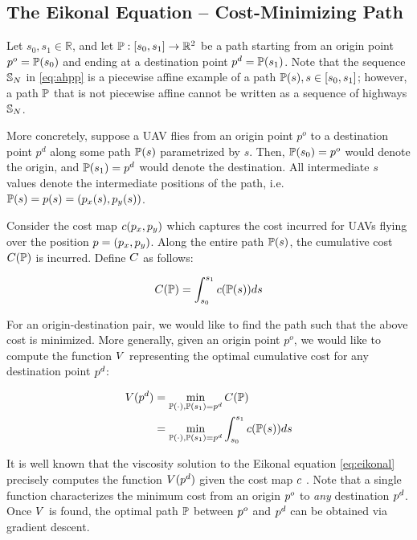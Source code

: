 \subsection{The Eikonal Equation -- Cost-Minimizing Path}
Let $s_0, s_1\in \mathbb{R}$, and let $\mathbb{P}: [s_0, s_1] \rightarrow \mathbb{R}^2$ be a path starting from an origin point $p^o = \mathbb{P}(s_0)$ and ending at a destination point $p^d = \mathbb{P}(s_1)$. Note that the sequence $\mathbb{S}_N$ in \eqref{eq:ahpp} is a piecewise affine example of a path $\mathbb{P}(s), s\in[s_0, s_1]$; however, a path $\mathbb{P}$ that is not piecewise affine cannot be written as a sequence of highways $\mathbb{S}_N$.

More concretely, suppose a UAV flies from an origin point $p^o$ to a destination point $p^d$ along some path $\mathbb{P}(s)$ parametrized by $s$. Then, $\mathbb{P}(s_0) = p^o$ would denote the origin, and $\mathbb{P}(s_1) = p^d$ would denote the destination. All intermediate $s$ values denote the intermediate positions of the path, i.e. $\mathbb{P}(s) = p(s) = (p_x(s), p_y(s))$.

Consider the cost map $c(p_x, p_y)$ which captures the cost incurred for UAVs flying over the position $p = (p_x, p_y)$. Along the entire path $\mathbb{P}(s)$, the cumulative cost $C(\mathbb{P})$ is incurred. Define $C$ as follows:

\begin{equation}
C(\mathbb{P}) = \int_{s_0}^{s_1} c(\mathbb{P}(s)) ds
\end{equation}

For an origin-destination pair, we would like to find the path such that the above cost is minimized. More generally, given an origin point $p^o$, we would like to compute the function $V$ representing the optimal cumulative cost for any destination point $p^d$:

\begin{equation}
\label{eq:rahpp} %
\begin{aligned}
\ocost(\pos^d) &= \min_{\ppath(\cdot), \ppath(s_1)=\pos^d} \ccost(\ppath) \\
&= \min_{\ppath(\cdot), \ppath(s_1)=\pos^d} \int_{s_0}^{s_1} \cmap(\ppath(s)) ds
\end{aligned}
\end{equation}

It is well known that the viscosity solution \cite{Crandall84} to the Eikonal equation \eqref{eq:eikonal} precisely computes the function $V(p^d)$ given the cost map $c$ \cite{Sethian96,Alton06}. Note that a single function characterizes the minimum cost from an origin $p^o$ to \textit{any} destination $p^d$. Once $V$ is found, the optimal path $\mathbb{P}$ between $p^o$ and $p^d$ can be obtained via gradient descent.

